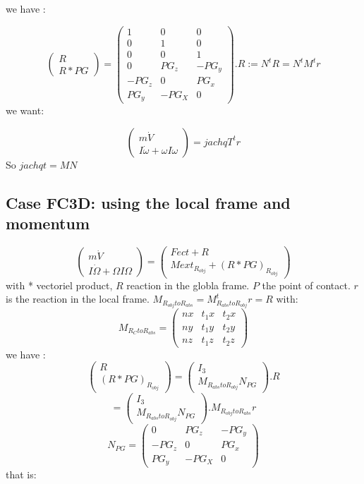   we have :
  
  \[\left(\begin{array}{c}R\\R*PG\end{array}\right)=\left(\begin{array}{ccc} 1&0&0\\0&1&0\\0&0&1\\
      0&PG_z&-PG_y\\-PG_z&0&PG_x\\PG_y&-PG_X&0\end{array}\right).R:=N^tR=N^tM^tr\]
      we want:
      
\[\left(\begin{array}{c}m \dot V\\I \dot \omega + \omega I \omega \end{array}\right)=jachqT^t r\]
So $jachqt=MN$

\subsection{Case FC3D: using the local frame and momentum}

\[\left(\begin{array}{c}m \dot V\\I \dot \Omega + \Omega I \Omega \end{array}\right)= \left(\begin{array}{c}Fect+R\\Mext _{R_{obj}} + (R*PG) _{R_{obj}} \end{array}\right)\]
  with * vectoriel product, $R$ reaction in the globla frame. $P$ the point of contact.
  $r$ is the reaction in the local frame.  $M_{R_{obj}toR_{abs}}=M_{R_{abs}toR_{obj}}^t r=R$ with:
  \[M_{R_{C}toR_{abs}}=\left(\begin{array}{ccc} nx&t_1x&t_2x \\ny&t_1y&t_2y\\nz&t_1z&t_2z \end{array}\right)\]
  we have :
  \[\left(\begin{array}{c}R\\(R*PG) _{R_{obj}}\end{array}\right)=\left(\begin{array}{c} I_3\\M_{R_{abs}toR_{obj}}N_{PG}\end{array}\right).R\]
  \[=\left(\begin{array}{c} I_3\\M_{R_{abs}toR_{obj}}N_{PG}\end{array}\right).M_{R_{obj}toR_{abs}}r\]
  \[ N_{PG}=\left(\begin{array}{ccc} 0&PG_z&-PG_y\\-PG_z&0&PG_x\\PG_y&-PG_X&0\end{array}\right)\]
    that is:
      
